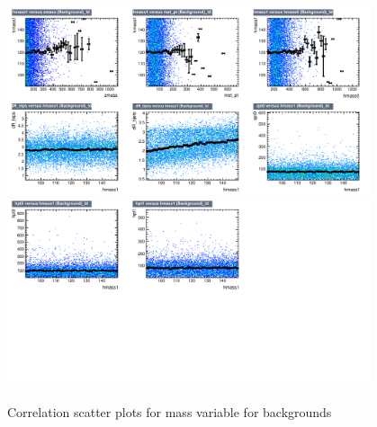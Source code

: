 \begin{figure}[!htb]%
\centering
\includegraphics[width=0.95\textwidth]{figures/CRTT/dataset/plots/correlationscatter_hmass1__Id_c3.pdf}
\includegraphics[width=0.95\textwidth]{figures/CRTT/dataset/plots/correlationscatter_hmass1__Id_c4.pdf}
\caption{ Correlation scatter plots for \HBB mass variable for backgrounds}%
\label{fig:correlations_CRTT_hmass1_BG}                                                       
\end{figure}
 

